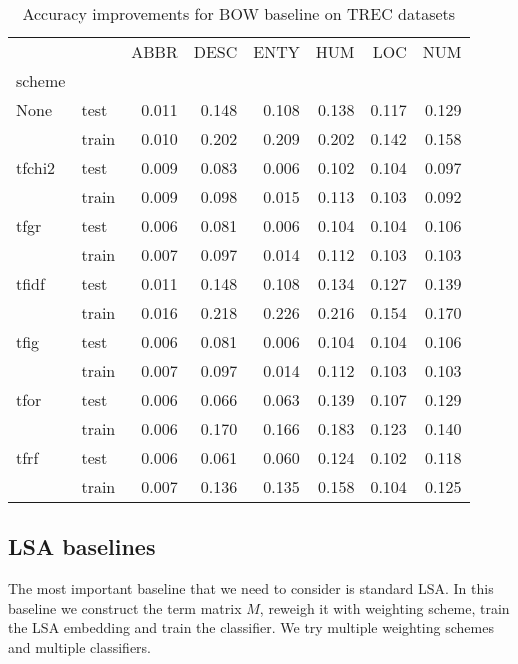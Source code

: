     \begin{table}[H]
    \begin{center}
    
    \begin{tabular}{llrrrrrr}
    \toprule
    {} &&  ABBR &  DESC &  ENTY &  HUM &  LOC &  NUM \\
    scheme &  & & & &&&\\
    \midrule
    None & test & 0.011 & 0.148 & 0.108 &0.138 &0.117 &0.129 \\
    {} & train & 0.010 & 0.202 & 0.209 &0.202 &0.142 &0.158 \\
    tfchi2 & test & 0.009 & 0.083 & 0.006 &0.102 &0.104 &0.097 \\
    {} & train & 0.009 & 0.098 & 0.015 &0.113 &0.103 &0.092 \\
    tfgr & test & 0.006 & 0.081 & 0.006 &0.104 &0.104 &0.106 \\
    {} & train & 0.007 & 0.097 & 0.014 &0.112 &0.103 &0.103 \\
    tfidf & test & 0.011 & 0.148 & 0.108 &0.134 &0.127 &0.139 \\
    {} & train & 0.016 & 0.218 & 0.226 &0.216 &0.154 &0.170 \\
    tfig & test & 0.006 & 0.081 & 0.006 &0.104 &0.104 &0.106 \\
    {} & train & 0.007 & 0.097 & 0.014 &0.112 &0.103 &0.103 \\
    tfor & test & 0.006 & 0.066 & 0.063 &0.139 &0.107 &0.129 \\
    {} & train & 0.006 & 0.170 & 0.166 &0.183 &0.123 &0.140 \\
    tfrf & test & 0.006 & 0.061 & 0.060 &0.124 &0.102 &0.118 \\
    {} & train & 0.007 & 0.136 & 0.135 &0.158 &0.104 &0.125 \\
    \bottomrule
    \end{tabular}
    
    \caption[Accuracy improvements for BOW baseline on TREC datasets]{Accuracy improvements for BOW baseline on TREC datasets}
    \label{tab:}
    \end{center}
    \end{table}

    \* %

    \subsection{LSA baselines} \label{sec:lsa:baseline}
    The most important baseline that we need to consider is standard LSA.
    In this baseline we construct the term matrix $M$, reweigh it with weighting scheme, train the LSA embedding and train the classifier.
    We try multiple weighting schemes and multiple classifiers.
    
